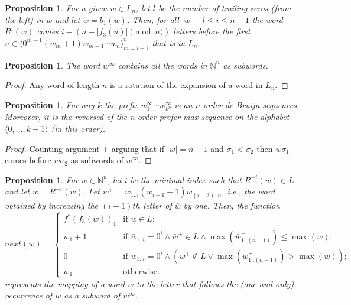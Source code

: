 \documentclass{article}
\newtheorem{proposition}[theorem]{Proposition}
\theoremstyle{definition}
\newcommand{\N}{{\mathbb{N}}}
\newcommand{\T}[1]{\langle{#1}\rangle}
\newcommand{\rr}[2]{R^{#2}({#1})}
\newcommand{\rl}[2]{R^{-{#2}}({#1})}
\begin{document}
\begin{proposition}\label{advanced-pos}
	For a given $w \in L_n$, let $l$ be the number of trailing zeros (from the left) in $w$ and let $\bar{w}=b_1(w)$. Then, for all $|w|-l \leq i \leq n-1$ the word $\rr{\bar{w}}{i}$ comes $i-(n-|f_3(u)| \pmod n)$ letters before the first $u \in \T{0^{m-1} (\bar{w}_{m} + 1) \bar{w}_{m+1}\cdots \bar{w}_n}_{m=i+1}^{n}$ that is in $L_n$. 
\end{proposition}


\begin{proposition}
	The word $w^\infty$ contains all the words in $\N^n$ as subwords.
\end{proposition}
\begin{proof}
	Any word of length $n$ is a rotation of the expansion of a word in $L_n$.
\end{proof}


\begin{proposition}
	For any $k$ the prefix $w^\infty_1 \cdots w^\infty_{k^n}$ is an $n$-order de Bruijn sequences. Moreover, it is the reversed of the n-order prefer-max sequence on the alphabet $\T{0,\dots,k-1}$ (in this order). 
\end{proposition}
\begin{proof}
	Counting argument + arguing that if $|w| =n-1$ and $\sigma_1 < \sigma_2$ then $w\sigma_1$ comes before $w\sigma_2$ as subwords of $w^\infty$.
\end{proof}


\begin{proposition}
	For $w \in \N^n$, let $i$ be the minimal index such that $\rl{w}{i} \in L$ and let $\bar{w}=\rl{w}{i}$. Let $\bar{w}^+=\bar{w}_{1..i}(\bar{w}_{i+1}+1)\bar{w}_{(i+2)..n}$, i.e., the word obtained by increasing the $(i+1)th$ letter of $\bar{w}$ by one.  Then, the function
	$$next(w)=
	\begin{cases}
	f^*(f_3(w))_1 & \text{if } w \in L; \\
	w_1+1         & \text{if }\bar{w}_{1..i}= 0^i \wedge \bar{w}^+ \in L\wedge \max{(\bar{w}^+_{1..(n-1)})} \leq \max(w); \\
	0             & \text{if }\bar{w}_{1..i}= 0^i \wedge (\bar{w}^+ \notin L \vee \max{(\bar{w}^+_{1..(n-1)})} > \max(w)); \\
	w_1           & \text{otherwise.}
	\end{cases}$$
	represents the mapping of a word $w$ to the letter that follows the (one and only) occurrence of $w$ as a subword of $w^\infty$.
\end{proposition}
\end{document}
